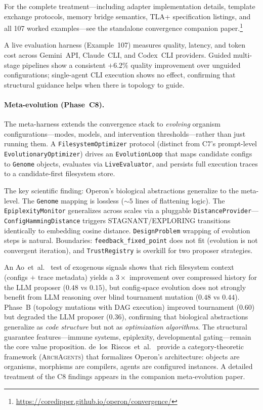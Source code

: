 For the complete treatment---including adapter implementation details, template
exchange protocols, memory bridge semantics, TLA+ specification listings, and all
107 worked examples---see the standalone convergence companion
paper.\footnote{\url{https://coredipper.github.io/operon/convergence/}}

A live evaluation harness (Example~107) measures quality, latency, and token
cost across Gemini~API, Claude~CLI, and Codex~CLI providers. Guided
multi-stage pipelines show a consistent $+6.2\%$ quality improvement over
unguided configurations; single-agent CLI execution shows no effect,
confirming that structural guidance helps when there is topology to guide.

\paragraph{Meta-evolution (Phase~C8).}
The meta-harness extends the convergence stack to \emph{evolving} organism
configurations---modes, models, and intervention thresholds---rather than
just running them. A \texttt{FilesystemOptimizer} protocol (distinct from
C7's prompt-level \texttt{EvolutionaryOptimizer}) drives an
\texttt{EvolutionLoop} that maps candidate configs to \texttt{Genome}
objects, evaluates via \texttt{LiveEvaluator}, and persists full execution
traces to a candidate-first filesystem store.

The key scientific finding: Operon's biological abstractions generalize to
the meta-level. The \texttt{Genome} mapping is lossless (${\sim}5$ lines of
flattening logic). The \texttt{EpiplexityMonitor} generalizes across scales
via a pluggable \texttt{DistanceProvider}---\texttt{ConfigHammingDistance}
triggers STAGNANT/EXPLORING transitions identically to embedding cosine
distance. \texttt{DesignProblem} wrapping of evolution steps is natural.
Boundaries: \texttt{feedback\_fixed\_point} does not fit (evolution is not
convergent iteration), and \texttt{TrustRegistry} is overkill for two
proposer strategies.

An Ao~et~al.~\cite{ao2026delegation} test of exogenous signals shows that
rich filesystem context (configs $+$ trace metadata) yields a $3\times$
improvement over compressed history for the LLM proposer ($0.48$ vs
$0.15$), but config-space evolution does not strongly benefit from LLM
reasoning over blind tournament mutation ($0.48$ vs $0.44$). Phase~B
(topology mutations with DAG execution) improved tournament ($0.60$) but
degraded the LLM proposer ($0.36$), confirming that biological abstractions
generalize as \emph{code structure} but not as \emph{optimization
algorithms}. The structural guarantee features---immune systems, epiplexity,
developmental gating---remain the core value proposition.
de~los~Riscos~et~al.~\cite{delosriscos2026categorical} provide a
category-theoretic framework (\textsc{ArchAgents}) that formalizes
Operon's architecture: objects are organisms, morphisms are compilers,
agents are configured instances. A detailed treatment of the C8 findings
appears in the companion meta-evolution paper.
